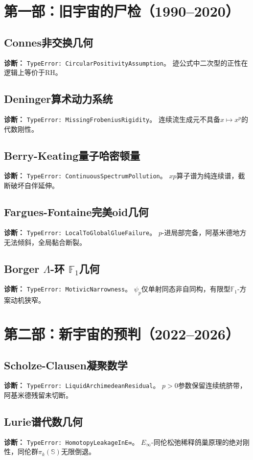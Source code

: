 \documentclass{article}
\begin{document}
\section{第一部：旧宇宙的尸检（1990--2020）}

\subsection{Connes非交换几何}
\textbf{诊断：} \texttt{TypeError: CircularPositivityAssumption}。
迹公式中二次型的正性在逻辑上等价于RH。

\subsection{Deninger算术动力系统}
\textbf{诊断：} \texttt{TypeError: MissingFrobeniusRigidity}。
连续流生成元不具备$x\mapsto x^p$的代数刚性。

\subsection{Berry-Keating量子哈密顿量}
\textbf{诊断：} \texttt{TypeError: ContinuousSpectrumPollution}。
$xp$算子谱为纯连续谱，截断破坏自伴延伸。

\subsection{Fargues-Fontaine完美oid几何}
\textbf{诊断：} \texttt{TypeError: LocalToGlobalGlueFailure}。
$p$-进局部完备，阿基米德地方无法倾斜，全局黏合断裂。

\subsection{Borger $\Lambda$-环 $\mathbb{F}_1$几何}
\textbf{诊断：} \texttt{TypeError: MotivicNarrowness}。
$\psi_p$仅单射同态非自同构，有限型$\mathbb{F}_1$-方案动机狭窄。

\section{第二部：新宇宙的预判（2022--2026）}

\subsection{Scholze-Clausen凝聚数学}
\textbf{诊断：} \texttt{TypeError: LiquidArchimedeanResidual}。
$p>0$参数保留连续统脐带，阿基米德残留未切断。

\subsection{Lurie谱代数几何}
\textbf{诊断：} \texttt{TypeError: HomotopyLeakageInE∞}。
$E_\infty$-同伦松弛稀释鸽巢原理的绝对刚性，同伦群$\pi_k(\mathbb{S})$无限倒退。
\end{document}
